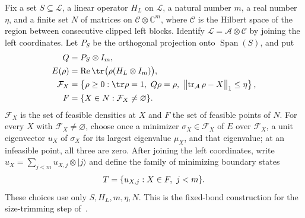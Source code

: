 \begin{definition}
    \label{def:lvv_finite_boundary_selection}
    \leanok
    Fix a set $S\subseteq\mathcal L$, a linear operator $H_L$ on $\mathcal L$,
    a natural number $m$, a real number $\eta$, and a finite set $N$ of
    matrices on $\mathcal C\otimes\mathbb C^m$, where $\mathcal C$ is the
    Hilbert space of the region between consecutive clipped left blocks. Identify
    $\mathcal L=\mathcal A\otimes\mathcal C$ by joining the left coordinates.
    Let $P_S$ be the orthogonal projection onto $\operatorname{Span}(S)$, and put
    \begin{align}
        Q       & =P_S\otimes I_m, \notag                                          \\
        E(\rho) & =\operatorname{Re}\tr\bigl(\rho(H_L\otimes I_m)\bigr),\notag     \\
        \mathcal F_X
                & =\left\{\rho\ge0:\tr\rho=1,\ Q\rho=\rho,\
        \bigl\|\operatorname{tr}_{\mathcal A}\rho-X\bigr\|_1\le\eta\right\},\notag \\
        F       & =\{X\in N:\mathcal F_X\ne\varnothing\}.\notag
    \end{align}
    $\mathcal F_X$ is the set of feasible densities at $X$ and $F$ the set of
    feasible points of $N$. For every $X$ with $\mathcal F_X\ne\varnothing$,
    choose once a minimizer $\sigma_X\in\mathcal F_X$ of $E$ over
    $\mathcal F_X$, a unit eigenvector $u_X$ of $\sigma_X$ for its largest
    eigenvalue $\mu_X$, and that eigenvalue; at an infeasible point, all three are
    zero. After joining the left coordinates, write
    $u_X=\sum_{j<m}u_{X,j}\otimes|j\rangle$ and define the family of
    minimizing boundary states
    \begin{align}
        T=\{u_{X,j}:X\in F,\ j<m\}.\notag
    \end{align}
    These choices use only $S,H_L,m,\eta,N$. This is the fixed-bond
    construction for the size-trimming step
    of~\cite[Claim~2.7, source lines 472--478 and 520--527]{Landau2015Polynomial}.
\end{definition}

